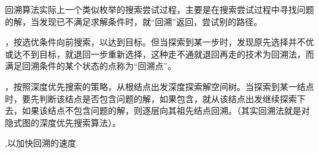     
\qquad 回溯算法实际上一个类似枚举的搜索尝试过程，主要是在搜索尝试过程中寻找问题的解，当发现已不满足求解条件时，就“回溯”返回，尝试别的路径。

，按选优条件向前搜索，以达到目标。但当探索到某一步时，发现原先选择并不优或达不到目标，就退回一步重新选择，这种走不通就退回再走的技术为回溯法，而满足回溯条件的某个状态的点称为“回溯点”。

，按照深度优先搜索的策略，从根结点出发深度探索解空间树。当探索到某一结点时，要先判断该结点是否包含问题的解，如果包含，就从该结点出发继续探索下去，如果该结点不包含问题的解，则逐层向其祖先结点回溯。（其实回溯法就是对隐式图的深度优先搜索算法）。

,以加快回溯的速度.

